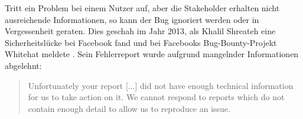 	{\color{red}\textit{\lipsum[1]}}
	
	Tritt ein Problem bei einem Nutzer auf, aber die Stakeholder erhalten nicht ausreichende Informationen, so kann der Bug ignoriert werden oder in Vergessenheit geraten. Dies geschah im Jahr 2013, als Khalil Shreateh eine Sicherheitslücke bei Facebook fand und bei Facebooks Bug-Bounty-Projekt Whitehat meldete \cite{FacebookBugBounyHunt}. Sein Fehlerreport wurde aufgrund mangelnder Informationen abgelehnt:
	
	\begin{quotation}
	Unfortunately your report [...] did not have enough technical information for us to take action  on  it. We  cannot  respond  to  reports  which  do  not contain enough detail to allow us to reproduce an issue.
	\end{quotation}